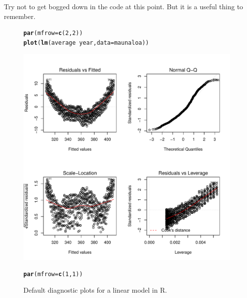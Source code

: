 \documentclass{tufte-handout}\usepackage[]{graphicx}\usepackage[]{color}
\makeatletter
\def\maxwidth{ %
  \ifdim\Gin@nat@width>\linewidth
    \linewidth
  \else
    \Gin@nat@width
  \fi
}
\newcommand{\hlnum}[1]{\textcolor[rgb]{0.686,0.059,0.569}{#1}}%
\newcommand{\hlopt}[1]{\textcolor[rgb]{0,0,0}{#1}}%
\newcommand{\hlstd}[1]{\textcolor[rgb]{0.345,0.345,0.345}{#1}}%
\newcommand{\hlkwc}[1]{\textcolor[rgb]{0.333,0.667,0.333}{#1}}%
\newcommand{\hlkwd}[1]{\textcolor[rgb]{0.737,0.353,0.396}{\textbf{#1}}}%
\newenvironment{kframe}{%
 \def\at@end@of@kframe{}%
 \ifinner\ifhmode%
  \def\at@end@of@kframe{\end{minipage}}%
  \begin{minipage}{\columnwidth}%
 \fi\fi%
 \def\FrameCommand##1{\hskip\@totalleftmargin \hskip-\fboxsep
 \colorbox{shadecolor}{##1}\hskip-\fboxsep
     \hskip-\linewidth \hskip-\@totalleftmargin \hskip\columnwidth}%
 \MakeFramed {\advance\hsize-\width
   \@totalleftmargin\z@ \linewidth\hsize
   \@setminipage}}%
 {\par\unskip\endMakeFramed%
 \at@end@of@kframe}
\newenvironment{knitrout}{}{} %
\makeatother
\begin{document}
Try not to get bogged down in the code at this point. But it is a useful thing to remember.

\begin{figure}
\label{fig:diagnostics}
\caption{Default diagnostic plots for a linear model in R.}
\begin{knitrout}
\color{fgcolor}\begin{kframe}
\begin{alltt}
\hlkwd{par}\hlstd{(}\hlkwc{mfrow}\hlstd{=}\hlkwd{c}\hlstd{(}\hlnum{2}\hlstd{,}\hlnum{2}\hlstd{))}
\hlkwd{plot}\hlstd{(}\hlkwd{lm}\hlstd{(average} \hlopt{~} \hlstd{year,} \hlkwc{data}\hlstd{=maunaloa))}
\end{alltt}
\end{kframe}
\includegraphics[width=\maxwidth]{figure/unnamed-chunk-57-1} 
\begin{kframe}\begin{alltt}
\hlkwd{par}\hlstd{(}\hlkwc{mfrow}\hlstd{=}\hlkwd{c}\hlstd{(}\hlnum{1}\hlstd{,}\hlnum{1}\hlstd{))}
\end{alltt}
\end{kframe}
\end{knitrout}
\end{figure}
\end{document}
